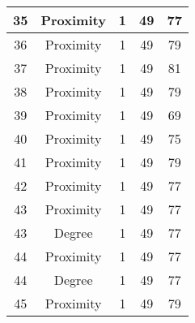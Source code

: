 \documentclass[results.tex]{subfiles}
\begin{document}
\begin{center}
\begin{tabular}{| c || c | c | c | c |}
            \hline
            35                      & Proximity                    & 1                      & 49                      & 77                   \\
            \hline
            36                      & Proximity                    & 1                      & 49                      & 79                   \\
            \hline
            37                      & Proximity                    & 1                      & 49                      & 81                   \\
            \hline
            38                      & Proximity                    & 1                      & 49                      & 79                   \\
            \hline
            39                      & Proximity                    & 1                      & 49                      & 69                   \\
            \hline
            40                      & Proximity                    & 1                      & 49                      & 75                   \\
            \hline
            41                      & Proximity                    & 1                      & 49                      & 79                   \\
            \hline
            42                      & Proximity                    & 1                      & 49                      & 77                   \\
            \hline
            43                      & Proximity                    & 1                      & 49                      & 77                   \\
            \hline
            43                      & Degree                       & 1                      & 49                      & 77                   \\
            \hline
            44                      & Proximity                    & 1                      & 49                      & 77                   \\
            \hline
            44                      & Degree                       & 1                      & 49                      & 77                   \\
            \hline
            45                      & Proximity                    & 1                      & 49                      & 79                   \\

\end{tabular}
\end{center}
\end{document}
